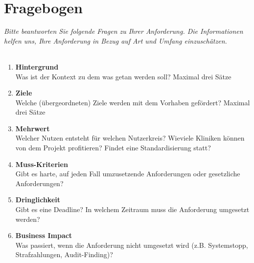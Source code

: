 \section{Fragebogen}
\textit{Bitte beantworten Sie folgende Fragen zu Ihrer Anforderung. Die Informationen helfen uns, Ihre Anforderung in Bezug auf Art und Umfang einzuschätzen. \\ \\
}

\begin{Form}
  \begin{enumerate}
  	\item \textbf{Hintergrund} \\
  	Was ist der Kontext zu dem was getan werden soll? Maximal drei Sätze \\
  	\TextField[multiline, name=background,width=0.9\textwidth,  height=2cm, value={} ]{}
  	
  	\item \textbf{Ziele} \\
  	Welche (übergeordneten) Ziele werden mit dem Vorhaben gefördert? Maximal drei Sätze  \\
  	\TextField[multiline, name=goal,width=0.9\textwidth,  height=2cm, value={} ]{}
  	
  	\item \textbf{Mehrwert} \\
  	Welcher Nutzen entsteht für welchen Nutzerkreis? Wieviele Kliniken können von dem Projekt profitieren? Findet eine Standardisierung statt?  \\
  	\TextField[multiline, name=value,width=0.9\textwidth,  height=2cm, value={} ]{}
  	
  	\item \textbf{Muss-Kriterien} \\
  	Gibt es harte, auf jeden Fall umzusetzende Anforderungen oder gesetzliche Anforderungen?   \\
  	\TextField[multiline, name=must,width=0.9\textwidth,  height=2cm, value={} ]{}
  	
  	\item \textbf{Dringlichkeit } \\
  Gibt es eine Deadline? In welchem Zeitraum muss die Anforderung umgesetzt werden? \\
  	\TextField[multiline, name=priority,width=0.9\textwidth,  height=2cm, value={} ]{}
  	\newpage
  	\item \textbf{Business Impact} \\
  	Was passiert, wenn die Anforderung nicht umgesetzt wird (z.B. Systemstopp, Strafzahlungen, Audit-Finding)?   \\
  	\TextField[multiline, name=business,width=0.9\textwidth,  height=2cm, value={}]{}
  	

\end{enumerate}
\end{Form}
